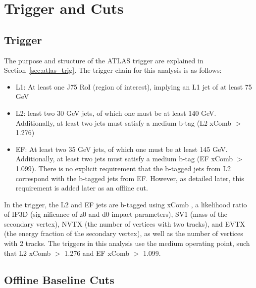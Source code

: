  

\chapter[Trigger and Cuts]{Trigger and Cuts}
 
\section{Trigger}
\label{sec:my_trigger}
The purpose and structure of the ATLAS trigger are explained in Section~\ref{sec:atlas_trig}.  The trigger chain for this analysis is as follows: 

\begin{itemize}
    \item L1: At least one J75 RoI (region of interest), implying an L1 jet of at least 75 GeV
    \item L2: least two 30 GeV jets, of which one must be at least 140 GeV. Additionally, at least two
jets must satisfy a medium b-tag (L2 xComb $>$ 1.276)
    \item EF: At least two 35 GeV jets, of which one must be at least 145 GeV. Additionally, at least two
jets must satisfy a medium b-tag (EF xComb $>$ 1.099). There is no explicit requirement that the
b-tagged jets from L2 correspond with the b-tagged jets from EF. However, as detailed later, this
requirement is added later as an offline cut.
\end{itemize}


In the trigger, the L2 and EF jets are b-tagged using xComb \cite{}, a likelihood ratio of IP3D (sig
nificance of z0 and d0 impact parameters), SV1 (mass of the secondary vertex), NVTX (the number of
vertices with two tracks), and EVTX (the energy fraction of the secondary vertex), as well as the number
of vertices with 2 tracks. The triggers in this analysis use the medium operating point, such that L2 xComb
$>$ 1.276 and EF xComb $>$ 1.099.




\section{Offline Baseline Cuts}


